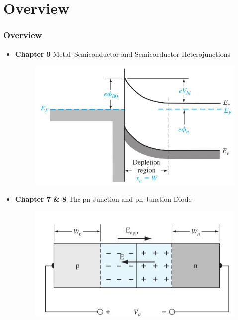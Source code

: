 \documentclass{beamer}
\begin{document}
\section{Overview}
    \begin{frame} \frametitle{Overview}
        \begin{itemize}
            \item \textbf{Chapter 9} Metal–Semiconductor and Semiconductor Heterojunctions
            \begin{figure}[H]
                \centering
                \includegraphics[width=0.6\linewidth]{C9-overview.jpg}
                \label{fig:C9-overview.jpg}
            \end{figure}
            \item \textbf{Chapter 7 \& 8} The pn Junction and pn Junction Diode
            \begin{minipage}{\linewidth}
                \centering
                \begin{minipage}{0.49\linewidth}
                    \begin{figure}[H]
                        \centering
                        \includegraphics[width=\linewidth]{C8-overview-1.jpg}
                        \label{fig:C8-overview-1.jpg}
                    \end{figure}
                \end{minipage}

\end{minipage}
\end{itemize}
\end{frame}
\end{document}
